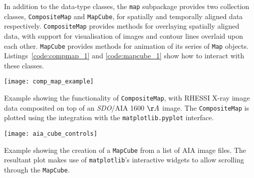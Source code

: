 In addition to the data-type classes, the \texttt{map} subpackage provides two 
collection classes, \texttt{CompositeMap} and \texttt{MapCube}, for 
spatially and temporally aligned data respectively.
\texttt{CompositeMap} provides methods for overlaying spatially aligned 
data, with support for visualisation of images and contour lines overlaid 
upon each other.
\texttt{MapCube} provides methods for animation of its series of \texttt{Map} 
objects. Listings~\ref{code:compmap_1} and \ref{code:mapcube_1} show how to 
interact with these classes.

\begin{listing}[H]
\begin{center}
\texttt{[image: comp\_map\_example]}
\end{center}
\caption{Example showing the functionality of \texttt{CompositeMap}, with RHESSI X-ray image data composited
on top of an \textit{SDO}/AIA 1600 $\AA$ image. The \texttt{CompositeMap} is plotted using the integration with the \texttt{matplotlib.pyplot} interface.}
\label{code:compmap_1}
\end{listing}

\begin{listing}[H]
\begin{center}
\texttt{[image: aia\_cube\_controls]}
\end{center}
\caption{Example showing the creation of a \texttt{MapCube} from a list of AIA image files. The 
resultant plot makes use of \texttt{matplotlib}'s interactive widgets to allow scrolling 
through the \texttt{MapCube}.}
\label{code:mapcube_1}
\end{listing}
